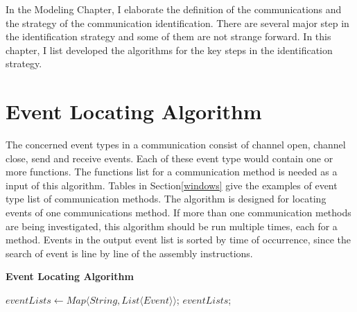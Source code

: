
\label{chapter:alo}
In the Modeling Chapter, I elaborate the definition of the communications and the strategy of the communication identification. There are several major step in the identification strategy and some of them are not strange forward. In this chapter, I list developed the algorithms for the key steps in the identification strategy.  

\section{Event Locating Algorithm}
The concerned event types in a communication consist of channel open, channel close, send and receive events. Each of these event type would contain one or more functions. The functions list for a communication method is needed as a input of this algorithm. Tables in Section\ref{windows} give the examples of event type list of communication methods. The algorithm is designed for locating events of one communications method. If more than one communication methods are being investigated, this algorithm should be run multiple times, each for a method. Events in the output event list is sorted by time of occurrence, since the search of event is line by line of the assembly instructions.

\begin{algorithm}[H]
\DontPrintSemicolon
\caption{{\bf Event Locating Algorithm} \label{eventLocAlg}}
$eventLists \leftarrow Map \langle String, List \langle Event\rangle \rangle$;\; 
\KwRet $eventLists$;\;
\end{algorithm} 

